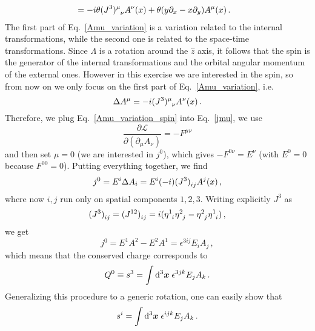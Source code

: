 \begin{sol}
\begin{align}
            &= -i\theta \tensor{(J^3)}{^\mu _\nu} A^{\nu}(x) + \theta(y\partial_{x} - x\partial_{y})A^{\mu}(x) \, .\label{Amu_variation}
    \end{align}
    The first part of Eq.~\eqref{Amu_variation} is a variation related to the internal transformations, while the second one is related to the space-time transformations.
    Since $\Lambda$ is a rotation around the $\hat{z}$ axis, it follows that the spin is the generator of the internal transformations and the orbital angular momentum of the external ones.
    However in this exercise we are interested in the spin, so from now on we only focus on the first part of Eq.~\eqref{Amu_variation}, i.e.
    \begin{equation}
    \label{Amu_variation_spin}
    \Delta A^{\mu} = -i \tensor{(J^3)}{^\mu _\nu} A^{\nu}(x)\,.
    \end{equation}
    Therefore, we plug Eq.~\eqref{Amu_variation_spin} into Eq.~\eqref{jmu}, we use
    \begin{equation}
        \frac{\partial \mathcal{L}}{\partial(\partial_{\mu}A_{\nu})} = -F^{\mu \nu} 
    \end{equation}
    and then set $\mu = 0$ (we are interested in $j^{0}$), which gives $-F^{0\nu} = E^{\nu}$ (with $E^{0} = 0$ because $F^{00} = 0$).
    Putting everything together, we find
    \begin{equation}
        j^{0} = E^{i}\Delta A_{i} = E^{i}(-i)\tensor{(J^3)}{_i_j} A^{j}(x)\, , 
    \end{equation}
    where now $i,j$ run only on spatial components $1,2,3$.  Writing explicitly $J^{3}$ as
    \begin{equation}
        \tensor{(J^3)}{_i_j} = \tensor{(J^{12})}{_i_j} = i(\tensor{\eta}{^1_i}\tensor{\eta}{^2_j} - \tensor{\eta}{^2_j}\tensor{\eta}{^1_i} )\, ,
    \end{equation}
    we get
    \begin{equation}
        j^{0} = E^{1}A^{2} - E^{2}A^{1} = \epsilon^{3ij}E_{i}A_{j}\,,
    \end{equation}
    which means that the conserved charge corresponds to
    \begin{equation}
            Q^{0} \equiv s^{3} = \int {\rm d}^3\boldsymbol{x} \;\epsilon^{3jk}E_{j}A_{k}\,.
    \end{equation}
    Generalizing this procedure to a generic rotation, one can easily show that 
    \begin{equation}
    \label{eq_si}
        s^{i} = \int \rmd^3\vx \;\epsilon^{ijk}E_{j}A_{k}\, .

\end{equation}
\end{sol}
